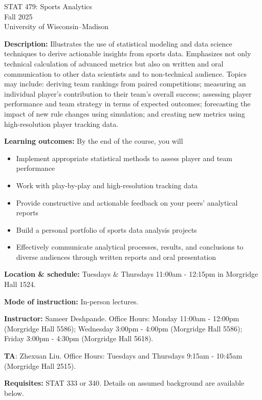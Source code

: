 \documentclass[11pt]{article}
\begin{document}
\begin{center}
\Large{STAT 479: Sports Analytics} \\
\large{Fall 2025} \\
University of Wisconsin--Madison
\end{center}

\singlespacing

\textbf{Description:} Illustrates the use of statistical modeling and data science techniques to derive actionable insights from sports data. Emphasizes not only technical calculation of advanced metrics but also on written and oral communication to other data scientists and to non-technical audience. Topics may include: deriving team rankings from paired competitions; measuring an individual player's contribution to their team's overall success; assessing player performance and team strategy in terms of expected outcomes; forecasting the impact of new rule changes using simulation; and creating new metrics using high-resolution player tracking data.

\textbf{Learning outcomes:} By the end of the course, you will
\begin{itemize}
\item{Implement appropriate statistical methods to assess player and team performance}
\item{Work with play-by-play and high-resolution tracking data}
\item{Provide constructive and actionable feedback on your peers' analytical reports}
\item{Build a personal portfolio of sports data analysis projects}
\item{Effectively communicate analytical processes, results, and conclusions to diverse audiences through written reports and oral presentation} 
\end{itemize}

\textbf{Location \& schedule:} Tuesdays \& Thursdays 11:00am - 12:15pm in Morgridge Hall 1524.

\textbf{Mode of instruction:} In-person lectures.

\textbf{Instructor:} Sameer Deshpande. Office Hours: Monday 11:00am - 12:00pm (Morgridge Hall 5586); Wednesday 3:00pm - 4:00pm (Morgridge Hall 5586); Friday 3:00pm - 4:30pm (Morgridge Hall 5618). 

\textbf{TA}: Zhexuan Liu. Office Hours: Tuesdays and Thursdays 9:15am - 10:45am (Morgridge Hall 2515). 

\textbf{Requisites:} STAT 333 or 340. Details on assumed background are available below.
\end{document}
